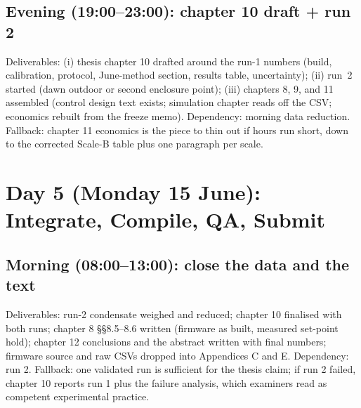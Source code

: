 \documentclass[11pt,a4paper]{article}
\begin{document}
\subsection*{Evening (19:00--23:00): chapter 10 draft + run 2}
Deliverables: (i) thesis chapter 10 drafted around the run-1 numbers
(build, calibration, protocol, June-method section, results table, uncertainty);
(ii) run~2 started (dawn outdoor or second enclosure point); (iii) chapters
8, 9, and 11 assembled (control design text exists; simulation chapter reads
off the CSV; economics rebuilt from the freeze memo). Dependency: morning data
reduction. Fallback: chapter 11 economics is the piece to thin out if hours
run short, down to the corrected Scale-B table plus one paragraph per scale.

\section{Day 5 (Monday 15 June): Integrate, Compile, QA, Submit}

\subsection*{Morning (08:00--13:00): close the data and the text}
Deliverables: run-2 condensate weighed and reduced; chapter 10 finalised with
both runs; chapter 8 \S\S8.5--8.6 written (firmware as built, measured
set-point hold); chapter 12 conclusions and the abstract written with final
numbers; firmware source and raw CSVs dropped into Appendices C and E.
Dependency: run 2. Fallback: one validated run is sufficient for the thesis
claim; if run 2 failed, chapter 10 reports run 1 plus the failure analysis,
which examiners read as competent experimental practice.
\end{document}

